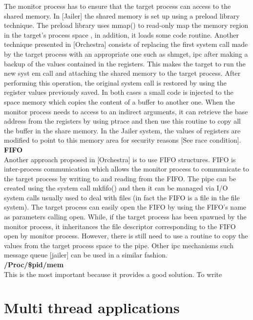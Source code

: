 The monitor process has to ensure that the target process can access to the shared memory. In [Jailer] the shared memory is set up using a preload library technique. The preload library uses mmap() to read-only map the memory region in the target’s process space , in addition, it loads some code routine. Another technique presented in [Orchestra] consists of replacing the first system call made by the target process with an appropriate one such as shmget, ipc after making a backup of the values contained in the registers.   This makes the target to run the new syst em call and attaching the shared memory to the target process. After performing this operation, the original system call is restored by using the register values previously saved.  In both cases a small code is injected to the space memory which copies the content of a buffer to another one. When the monitor process needs to access to an indirect arguments, it can retrieve the base address from the registers by using ptrace and then use this routine to copy all the buffer in the share memory. In the Jailer system, the values of registers are modified to point to this memory area for security reasons [See race condition].\\
\textbf{FIFO}\\
Another approach proposed in [Orchestra] is to use FIFO structures.  FIFO is inter-process communication which allows the monitor process to communicate to the target process by writing to and reading from the FIFO.  The pipe can be created using the system call mkfifo()\citep{Garfinkel03ostia:a} and then it can be managed via I/O system calls usually used to deal with files (in fact the FIFO is a file in the file system). 
The target process can easily open the FIFO by using the FIFO’s name as parameters calling open.  While, if the target process has been spawned by the monitor process, it inheritances the file descriptor corresponding to the FIFO open by monitor process. However, there is still need to use a routine to copy the values from the target process space to the pipe.  Other ipc mechanisms such message queue [jailer] can be used in a similar fashion. \\
\textbf{ /Proc/\$pid/mem  }\\
 
This is the most important because it provides a good solution. 
To write 

\section{Multi thread applications}

